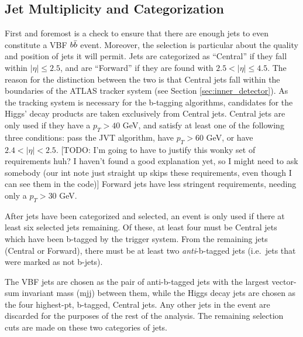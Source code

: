     \subsection{Jet Multiplicity and Categorization}
        
        First and foremost is a check to ensure that there are enough jets to even constitute a VBF \to $b \bar{b}$ event.
        Moreover, the selection is particular about the quality and position of jets it will permit.
        Jets are categorized as ``Central'' if they fall within $|\eta| \leq 2.5$,
            and are ``Forward'' if they are found with $ 2.5 < |\eta| \leq 4.5 $.
        The reason for the distinction between the two is that Central jets fall within the boundaries of the ATLAS tracker system
            (see Section \ref{sec:inner_detector}).
        As the tracking system is necessary for the b-tagging algorithms,
            candidates for the Higgs' decay products are taken exclusively from Central jets.
        Central jets are only used if they have a $p_T > 40$ GeV, and satisfy at least one of the following three conditions:
            pass the JVT algorithm, have $p_T > 60$ GeV, or have $2.4 < |\eta| < 2.5$.
        [TODO: I'm going to have to justify this wonky set of requirements huh?
            I haven't found a good explanation yet, so I might need to ask somebody
            (our int note just straight up skips these requirements, even though I can see them in the code)]
        Forward jets have less stringent requirements, needing only a $p_T > 30$ GeV.

        After jets have been categorized and selected, an event is only used if there at least six selected jets remaining.
        Of these, at least four must be Central jets which have been b-tagged by the trigger system.
        From the remaining jets (Central or Forward), there must be at least two \textit{anti}-b-tagged jets
            (i.e.\ jets that were marked as not b-jets).

        The VBF jets are chosen as the pair of anti-b-tagged jets with the largest vector-sum invariant mass (mjj) between them,
            while the Higgs decay jets are chosen as the four highest-pt, b-tagged, Central jets.
        Any other jets in the event are discarded for the purposes of the rest of the analysis.
        The remaining selection cuts are made on these two categories of jets.
        


